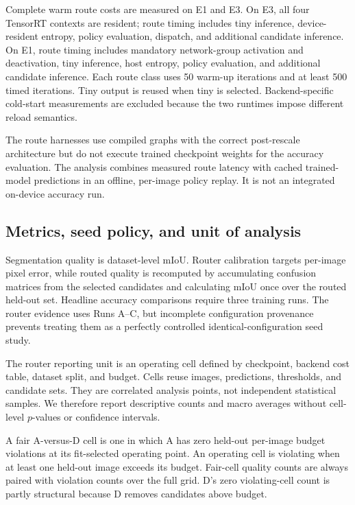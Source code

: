 \documentclass[a4paper,review,12pt]{elsarticle}
\newcommand{\miou}{mIoU}
\begin{document}
Complete warm route costs are measured on E1 and E3. On E3, all four TensorRT contexts are resident; route timing includes tiny inference, device-resident entropy, policy evaluation, dispatch, and additional candidate inference. On E1, route timing includes mandatory network-group activation and deactivation, tiny inference, host entropy, policy evaluation, and additional candidate inference. Each route class uses 50 warm-up iterations and at least 500 timed iterations. Tiny output is reused when tiny is selected. Backend-specific cold-start measurements are excluded because the two runtimes impose different reload semantics.

The route harnesses use compiled graphs with the correct post-rescale architecture but do not execute trained checkpoint weights for the accuracy evaluation. The analysis combines measured route latency with cached trained-model predictions in an offline, per-image policy replay. It is not an integrated on-device accuracy run.

\subsection{Metrics, seed policy, and unit of analysis}

Segmentation quality is dataset-level \miou{}. Router calibration targets per-image pixel error, while routed quality is recomputed by accumulating confusion matrices from the selected candidates and calculating \miou{} once over the routed held-out set. Headline accuracy comparisons require three training runs. The router evidence uses Runs A--C, but incomplete configuration provenance prevents treating them as a perfectly controlled identical-configuration seed study.

The router reporting unit is an operating cell defined by checkpoint, backend cost table, dataset split, and budget. Cells reuse images, predictions, thresholds, and candidate sets. They are correlated analysis points, not independent statistical samples. We therefore report descriptive counts and macro averages without cell-level $p$-values or confidence intervals.

A fair A-versus-D cell is one in which A has zero held-out per-image budget violations at its fit-selected operating point. An operating cell is violating when at least one held-out image exceeds its budget. Fair-cell quality counts are always paired with violation counts over the full grid. D's zero violating-cell count is partly structural because D removes candidates above budget.
\end{document}
